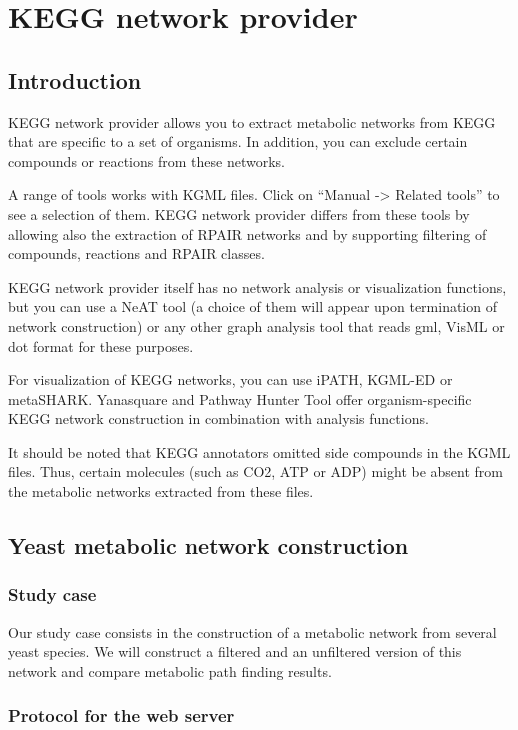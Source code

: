 \chapter{KEGG network provider}

\section{Introduction}

KEGG network provider allows you to extract metabolic networks from KEGG that are specific to a set of organisms.
In addition, you can exclude certain compounds or reactions from these networks.

A range of tools works with KGML files. Click on ``Manual -> Related tools'' to see a selection of them.
KEGG network provider differs from these tools by allowing also the extraction of RPAIR networks and by supporting
filtering of compounds, reactions and RPAIR classes.

KEGG network provider itself has no network analysis or visualization functions,
but you can use a NeAT tool (a choice of them will appear upon termination of network construction)
or any other graph analysis tool that reads gml, VisML or dot format for these purposes.

For visualization of KEGG networks, you can use iPATH, KGML-ED or metaSHARK.
Yanasquare and Pathway Hunter Tool offer organism-specific KEGG network construction in combination
with analysis functions.

It should be noted that KEGG annotators omitted side compounds in the KGML files. Thus, certain molecules
(such as CO2, ATP or ADP) might be absent from the metabolic networks extracted from these files.

\section{Yeast metabolic network construction}

\subsection{Study case}

Our study case consists in the construction of a metabolic network from several yeast species. We will construct a filtered
and an unfiltered version of this network and compare metabolic path finding results.

\subsection{Protocol for the web server}

